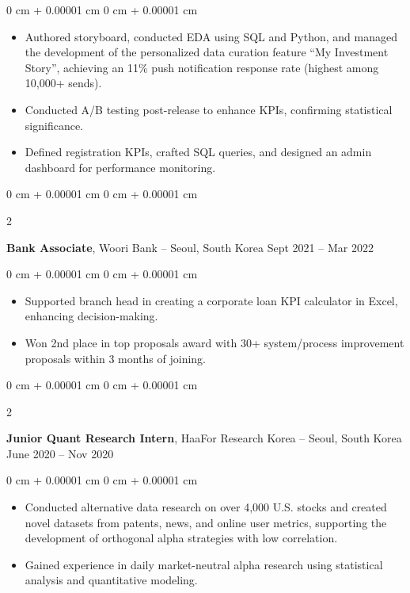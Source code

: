 \documentclass[10pt, letterpaper]{article}
\newenvironment{highlights}{
    \begin{itemize}[
        topsep=0.10 cm,
        parsep=0.10 cm,
        partopsep=0pt,
        itemsep=0pt,
        leftmargin=0 cm + 10pt
    ]
}{
    \end{itemize}
} %
\newenvironment{onecolentry}{
    \begin{adjustwidth}{
        0 cm + 0.00001 cm
    }{
        0 cm + 0.00001 cm
    }
}{
    \end{adjustwidth}
} %
\newenvironment{twocolentry}[2][]{
    \onecolentry
    \def\secondColumn{#2}
    \setcolumnwidth{\fill, 4.5 cm}
    \begin{paracol}{2}
}{
    \switchcolumn \raggedleft \secondColumn
    \end{paracol}
    \endonecolentry
} %
\begin{document}
        \vspace{0.10 cm}
        \begin{onecolentry}
            \begin{highlights}
                \item Authored storyboard, conducted EDA using SQL and Python, and managed the development of the personalized data curation feature “My Investment Story”, achieving an 11\% push notification response rate (highest among 10,000+ sends).
                \item Conducted A/B testing post-release to enhance KPIs, confirming statistical significance.
                \item Defined registration KPIs, crafted SQL queries, and designed an admin dashboard for performance monitoring.
            \end{highlights}
        \end{onecolentry}


        \vspace{0.2 cm}

        \begin{twocolentry}{
            Sept 2021 – Mar 2022
        }
            \textbf{Bank Associate}, Woori Bank -- Seoul, South Korea\end{twocolentry}

        \vspace{0.10 cm}
        \begin{onecolentry}
            \begin{highlights}
                \item Supported branch head in creating a corporate loan KPI calculator in Excel, enhancing decision-making.
                \item Won 2nd place in top proposals award with 30+ system/process improvement proposals within 3 months of joining.
            \end{highlights}
        \end{onecolentry}


        \vspace{0.2 cm}

        \begin{twocolentry}{
            June 2020 – Nov 2020
        }
            \textbf{Junior Quant Research Intern}, HaaFor Research Korea -- Seoul, South Korea\end{twocolentry}

        \vspace{0.10 cm}
        \begin{onecolentry}
            \begin{highlights}
                \item Conducted alternative data research on over 4,000 U.S. stocks and created novel datasets from patents, news, and online user metrics, supporting the development of orthogonal alpha strategies with low correlation.
                \item Gained experience in daily market-neutral alpha research using statistical analysis and quantitative modeling.
            \end{highlights}
        \end{onecolentry}
\end{document}
